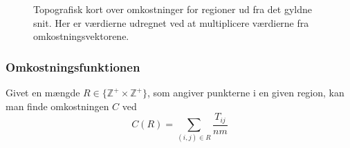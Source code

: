 {\begin{figure}[h]
    \setlength\fboxsep{0pt}
    \setlength\fboxrule{0.5pt}
    \begin{center}
    \end{center}
    \caption[]{Topografisk kort over omkostninger for regioner ud fra det
    gyldne snit. Her er værdierne udregnet ved at multiplicere værdierne
    fra omkostningsvektorene.}
    \label{topography_times}
\end{figure}

\subsubsection*{Omkostningsfunktionen}

Givet en mængde $R \in \{\mathbb{Z}^{+}\times\mathbb{Z}^{+}\}$, som
angiver punkterne i en given region, kan man finde omkostningen
$C$ ved
\begin{equation}
    C(R) = \sum_{(i, j) \in R}{\frac{T_{ij}}{nm}}
\end{equation}

}

